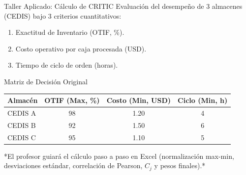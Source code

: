 \documentclass[aspectratio=169, 10pt]{beamer}
\begin{document}
\begin{frame}{Taller Aplicado: Cálculo de CRITIC}
    Evaluación del desempeño de 3 almacenes (CEDIS) bajo 3 criterios cuantitativos:
    \begin{enumerate}
        \item Exactitud de Inventario (OTIF, \%).
        \item Costo operativo por caja procesada (USD).
        \item Tiempo de ciclo de orden (horas).
    \end{enumerate}
    
    \begin{block}{Matriz de Decisión Original}
        \scriptsize
        \begin{center}
            \begin{tabular}{lccc}
                \toprule
                \textbf{Almacén} & \textbf{OTIF (Max, \%)} & \textbf{Costo (Min, USD)} & \textbf{Ciclo (Min, h)} \\
                \midrule
                CEDIS A & 98 & 1.20 & 4 \\
                CEDIS B & 92 & 1.50 & 6 \\
                CEDIS C & 95 & 1.10 & 5 \\
                \bottomrule
            \end{tabular}
        \end{center}
    \end{block}
    \smallskip
    *El profesor guiará el cálculo paso a paso en Excel (normalización max-min, desviaciones estándar, correlación de Pearson, $C_j$ y pesos finales).*
\end{frame}
\end{document}
